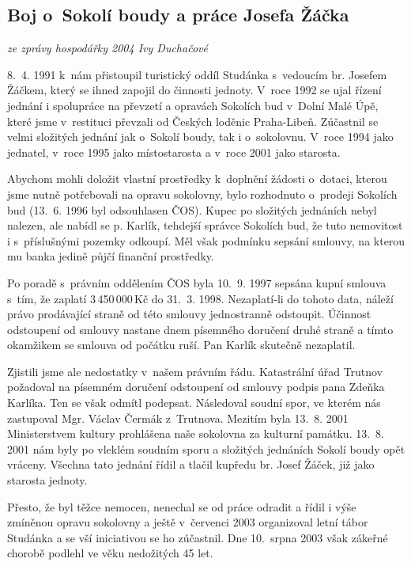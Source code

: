 \documentclass[a5paper, 11pt, twoside]{article}
\begin{document}
\clearpage

\subsection{Boj o~Sokolí boudy a práce Josefa Žáčka}

\begin{center}
  \textit{ze zprávy hospodářky 2004 Ivy Duchačové}
\end{center}

8.~4. 1991 k~nám přistoupil turistický oddíl Studánka s~vedoucím br.
Josefem Žáčkem, který se ihned zapojil do činnosti jednoty. V~roce 1992
se ujal řízení jednání i spolupráce na převzetí a opravách Sokolích bud
v~Dolní Malé Úpě, které jsme v~restituci převzali od Českých loděnic
Praha-Libeň. Zúčastnil se velmi složitých jednání jak o~Sokolí boudy,
tak i o~sokolovnu. V~roce 1994 jako jednatel, v~roce 1995 jako
místostarosta a v~roce 2001 jako starosta.

Abychom mohli doložit vlastní prostředky k~doplnění žádosti o~dotaci,
kterou jsme nutně potřebovali na opravu sokolovny, bylo rozhodnuto
o~prodeji Sokolích bud (13.~6. 1996 byl odsouhlasen ČOS). Kupec po
složitých jednáních nebyl nalezen, ale nabídl se p. Karlík, tehdejší
správce Sokolích bud, že tuto nemovitost i s~příslušnými pozemky
odkoupí. Měl však podmínku sepsání smlouvy, na kterou mu banka jedině
půjčí finanční prostředky.

Po poradě s~právním oddělením ČOS byla 10.~9. 1997 sepsána kupní smlouva
s~tím, že zaplatí 3\,450\,000\,Kč do 31.~3. 1998. Nezaplatí-li do tohoto
data, náleží právo prodávající straně od této smlouvy jednostranně
odstoupit. Účinnost odstoupení od smlouvy nastane dnem písemného
doručení druhé straně a tímto okamžikem se smlouva od počátku ruší. Pan
Karlík skutečně nezaplatil.

Zjistili jsme ale nedostatky v~našem právním řádu. Katastrální úřad
Trutnov požadoval na písemném doručení odstoupení od smlouvy podpis pana
Zdeňka Karlíka. Ten se však odmítl podepsat. Následoval soudní spor, ve
kterém nás zastupoval Mgr. Václav Čermák z~Trutnova. Mezitím byla 13.~8.
2001 Ministerstvem kultury prohlášena naše sokolovna za kulturní
památku. 13.~8. 2001 nám byly po vleklém soudním sporu a složitých
jednáních Sokolí boudy opět vráceny. Všechna tato jednání řídil a tlačil
kupředu br. Josef Žáček, již jako starosta jednoty.

Přesto, že byl těžce nemocen, nenechal se od práce odradit a řídil i
výše zmíněnou opravu sokolovny a ještě v~červenci 2003 organizoval letní
tábor Studánka a se vší iniciativou se ho zúčastnil. Dne 10.~srpna 2003
však zákeřné chorobě podlehl ve věku nedožitých 45 let.
\end{document}
